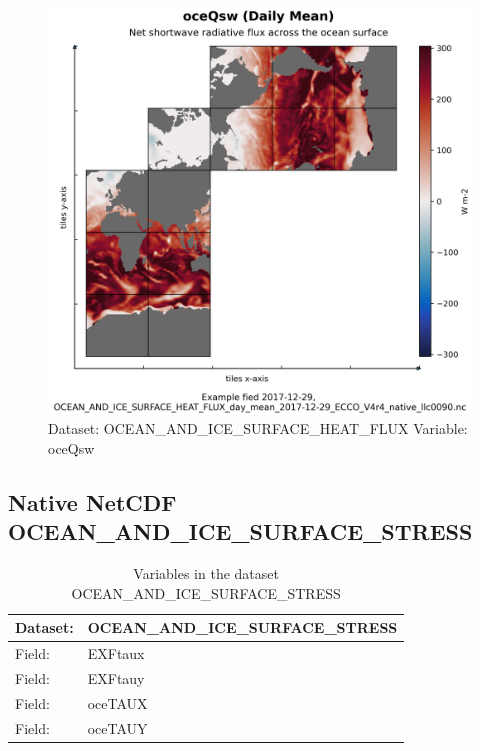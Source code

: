 \begin{figure}[H]
\centering
\includegraphics[width=\textwidth]{../images/plots/native_plots/Ocean_and_Sea-Ice_Surface_Heat_Fluxes/oceQsw.png}
\caption{Dataset: OCEAN\_AND\_ICE\_SURFACE\_HEAT\_FLUX Variable: oceQsw}
\label{tab:table-OCEAN_AND_ICE_SURFACE_HEAT_FLUX_oceQsw-Plot}
\end{figure}
\pagebreak
\subsection{Native NetCDF OCEAN\_AND\_ICE\_SURFACE\_STRESS}
\newp
\begin{longtable}{|p{}|p{}|}
\caption{Variables in the dataset OCEAN\_AND\_ICE\_SURFACE\_STRESS}
\label{tab:table-OCEAN_AND_ICE_SURFACE_STRESS-fields} \\ 
\hline \endhead \hline \endfoot
\rowcolor{lightgray} \textbf{Dataset:} & \textbf{OCEAN\_AND\_ICE\_SURFACE\_STRESS} \\ \hline
Field: &EXFtaux \\ \hline
Field: &EXFtauy \\ \hline
Field: &oceTAUX \\ \hline
Field: &oceTAUY \\ \hline
\end{longtable}

\pagebreak

